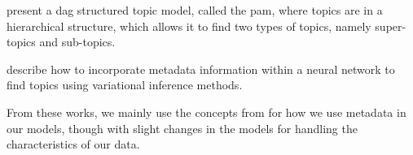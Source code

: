 \citet{li2006pachinko} present a \gls{dag} structured topic model, called the \acrfull{pam}, where topics are in a hierarchical structure, which allows it to find two types of topics, namely super-topics and sub-topics. 


\citet{card2017neural} describe how to incorporate metadata information within a neural network to find topics using variational inference methods.

From these works, we mainly use the concepts from \citet{author_topic_2012} for how we use metadata in our models, though with slight changes in the models for handling the characteristics of our data.

